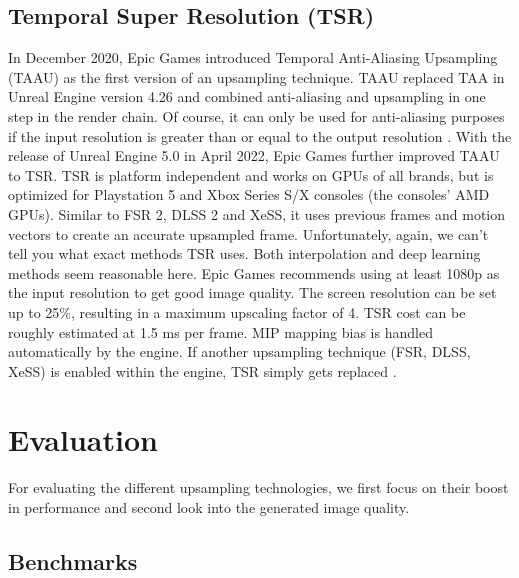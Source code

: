 \documentclass[letterpaper, 10 pt, conference]{ieeeconf}  %
\begin{document}
\subsection{Temporal Super Resolution (TSR)}

In December 2020, Epic Games introduced Temporal Anti-Aliasing Upsampling (TAAU) as the first version of an upsampling technique. 
TAAU replaced TAA in Unreal Engine version 4.26 and combined anti-aliasing and upsampling in one step in the render chain.
Of course, it can only be used for anti-aliasing purposes if the input resolution is greater than or equal to the output resolution \cite{unreal_all}.
With the release of Unreal Engine 5.0 in April 2022, Epic Games further improved TAAU to TSR.
TSR is platform independent and works on GPUs of all brands, but is optimized for Playstation 5 and Xbox Series S/X consoles (the consoles' AMD GPUs).
Similar to FSR 2, DLSS 2 and XeSS, it uses previous frames and motion vectors to create an accurate upsampled frame. 
Unfortunately, again, we can't tell you what exact methods TSR uses.
Both interpolation and deep learning methods seem reasonable here.
Epic Games recommends using at least 1080p as the input resolution to get good image quality.
The screen resolution can be set up to 25\%, resulting in a maximum upscaling factor of 4.
TSR cost can be roughly estimated at 1.5 ms per frame.
MIP mapping bias is handled automatically by the engine.
If another upsampling technique (FSR, DLSS, XeSS) is enabled within the engine, TSR simply gets replaced \cite{TSR_intro}.

\section{Evaluation}
\label{Sec:Evaluation}
For evaluating the different upsampling technologies, we first focus on their boost in performance and second look into the generated image quality.

\subsection{Benchmarks}
\end{document}
